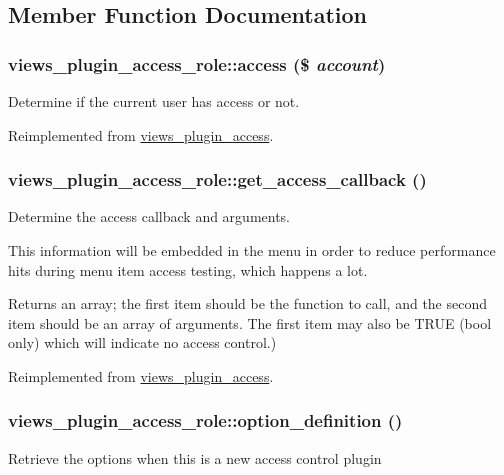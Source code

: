 \subsection{Member Function Documentation}
\hypertarget{classviews__plugin__access__role_a8de6032d940b90e06820cdbd9a15a51c}{
\subsubsection[{access}]{\setlength{\rightskip}{0pt plus 5cm}views\_\-plugin\_\-access\_\-role::access (\$ {\em account})}}
\label{classviews__plugin__access__role_a8de6032d940b90e06820cdbd9a15a51c}
Determine if the current user has access or not. 

Reimplemented from \hyperlink{classviews__plugin__access_ad24d38c1b1a1bd7527b2b96a2103cede}{views\_\-plugin\_\-access}.\hypertarget{classviews__plugin__access__role_a50094384e297acdd629d9462004df69a}{
\subsubsection[{get\_\-access\_\-callback}]{\setlength{\rightskip}{0pt plus 5cm}views\_\-plugin\_\-access\_\-role::get\_\-access\_\-callback ()}}
\label{classviews__plugin__access__role_a50094384e297acdd629d9462004df69a}
Determine the access callback and arguments.

This information will be embedded in the menu in order to reduce performance hits during menu item access testing, which happens a lot.

\begin{DoxyReturn}{Returns}
an array; the first item should be the function to call, and the second item should be an array of arguments. The first item may also be TRUE (bool only) which will indicate no access control.) 
\end{DoxyReturn}


Reimplemented from \hyperlink{classviews__plugin__access_ad4038a32fccc6a662a74f437d0bf6a23}{views\_\-plugin\_\-access}.\hypertarget{classviews__plugin__access__role_a76714a96150c4611683068a50be7eb26}{
\subsubsection[{option\_\-definition}]{\setlength{\rightskip}{0pt plus 5cm}views\_\-plugin\_\-access\_\-role::option\_\-definition ()}}
\label{classviews__plugin__access__role_a76714a96150c4611683068a50be7eb26}
Retrieve the options when this is a new access control plugin 

